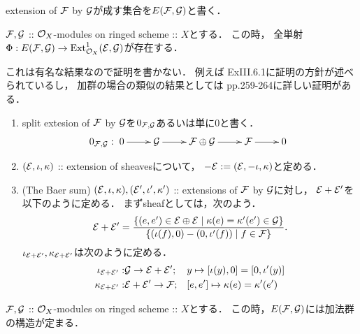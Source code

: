 \documentclass[a4paper]{jsarticle}
\begin{document}
    extension of $\mathcal{F}$ by $\mathcal{G}$が成す集合を$E(\mathcal{F}, \mathcal{G})$と書く．
    \begin{Thm}\label{thm:ExtAndExt1}
        $\mathcal{F}, \mathcal{G}$
        :: $\mathcal{O}_X$-modules on ringed scheme :: $X$とする．
        この時，
        全単射$\Phi: E(\mathcal{F}, \mathcal{G}) \to \operatorname{Ext}^1_{\mathcal{O}_X}(\mathcal{E}, \mathcal{G})$が存在する．
    \end{Thm}
    これは有名な結果なので証明を書かない．
    例えば\cite{HarAG} ExIII.6.1に証明の方針が述べられているし，
    加群の場合の類似の結果としては\cite{Shiho} pp.259-264に詳しい証明がある．

    \begin{Def}
        \begin{enumerate}[label=(\arabic*), leftmargin=*]
        \item
            split extesion of $\mathcal{F}$ by $\mathcal{G}$を$0_{\mathcal{F}, \mathcal{G}}$あるいは単に$0$と書く．
            \[
            0_{\shF, \shG}:
                \xymatrix{
                    0 \ar[r]& \shG \ar[r]& \shF \oplus \shG \ar[r]& \shF \ar[r]& 0
            }\]
            
        \item
            $(\mathcal{E}, \iota, \kappa)$ :: extension of sheavesについて，
            $-\mathcal{E}:=(\mathcal{E}, -\iota, \kappa)$と定める．

        \item
            (The Baer sum)
            $(\mathcal{E}, \iota, \kappa), (\mathcal{E}', \iota', \kappa')$
            :: extensions of $\mathcal{F}$ by $\mathcal{G}$に対し，
            $\mathcal{E}+\mathcal{E}'$を以下のように定める．
            まずsheafとしては，次のよう．
            \[
                \mathcal{E}+\mathcal{E}'
                =\frac
                {\{(e, e') \in \mathcal{E} \oplus \mathcal{E} \mid \kappa(e)=\kappa'(e') \in \mathcal{G}\}}
                {\{ (\iota(f), 0)-(0, \iota'(f)) \mid f \in \mathcal{F} \}}.
            \]
            $\iota_{\mathcal{E}+\mathcal{E}'}, \kappa_{\mathcal{E}+\mathcal{E}'}$は次のように定める．
            \begin{align*}
                \iota_{\mathcal{E}+\mathcal{E}'}:& \mathcal{G} \to \mathcal{E}+\mathcal{E}'; && y \mapsto [\iota(y), 0]=[0, \iota'(y)] \\
                \kappa_{\mathcal{E}+\mathcal{E}'}:& \mathcal{E}+\mathcal{E}' \to \mathcal{F}; && [e, e'] \mapsto \kappa(e)=\kappa'(e')
            \end{align*}
    \end{enumerate}
    \end{Def}
    
    \begin{Lemma}
        $\mathcal{F}, \mathcal{G}$ :: $\mathcal{O}_X$-modules on ringed scheme :: $X$とする．
        この時，$E(\mathcal{F}, \mathcal{G})$には加法群の構造が定まる．
    \end{Lemma}
\end{document}
